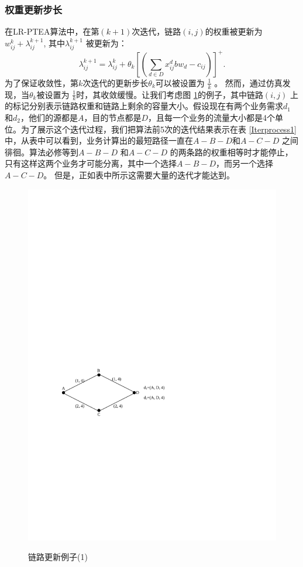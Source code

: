 \subsubsection{权重更新步长}
在LR-PTEA算法中，在第$(k+1)$次迭代，链路$(i,j)$的权重被更新为$w_{ij}^{k} + \lambda_{ij}^{k+1}$, 其中$\lambda_{ij}^{k+1}$ 被更新为：
\begin{equation}\label{Iter}
\lambda_{ij}^{k+1} = \lambda_{ij}^k + \theta_k[(\sum\limits_{d \in D}x_{ij}^dbw_d - c_{ij})]^+.
\end{equation}
为了保证收敛性，第$k$次迭代的更新步长$\theta_k$可以被设置为 $\frac{1}{k}$ 。 然而，通过仿真发现，当$\theta_k$被设置为 $\frac{1}{k}$时，其收敛缓慢。让我们考虑图 \ref{u1}的例子，其中链路$(i,j)$ 上的标记分别表示链路权重和链路上剩余的容量大小。假设现在有两个业务需求$d_1$ 和$d_2$，他们的源都是$A$，目的节点都是$D$，且每一个业务的流量大小都是4个单位。为了展示这个迭代过程，我们把算法前5次的迭代结果表示在表 \ref{Iterprocess1}中，从表中可以看到，业务计算出的最短路径一直在$A-B-D$和$A-C-D$ 之间徘徊。算法必修等到$A-B-D$ 和$A-C-D$ 的两条路的权重相等时才能停止，只有这样这两个业务才可能分离，其中一个选择$A-B-D$，而另一个选择$A-C-D$。 但是，正如表中所示这需要大量的迭代才能达到。
\begin{figure}
\setlength{\abovecaptionskip}{-0.5cm}
\begin{center}
{\includegraphics[width=0.4 \textwidth]{figures/IterNum.pdf}}
\end{center}
\caption{{\footnotesize{链路更新例子(1)}}}
\label{u1}
\end{figure}
